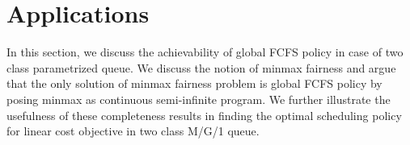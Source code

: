 \documentclass[letterpaper, 10 pt, conference]{ieeeconf}  %
\newtheorem{lem}[thm]{Lemma}
\begin{document}

\section{Applications}\label{applications}
In this section, we discuss the achievability of global FCFS policy in case of two class parametrized queue. 
We discuss the notion of minmax fairness and argue that the only solution of minmax fairness problem is global FCFS policy by posing minmax as continuous semi-infinite program. We further illustrate the usefulness of these completeness results in finding the optimal scheduling policy for linear cost objective in two class M/G/1 queue.    
\end{document}
